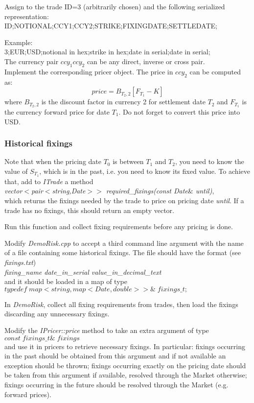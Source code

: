 \documentclass[10pt]{article}
\begin{document}
Assign to the trade ID=3 (arbitrarily chosen) and the following serialized representation:\\
ID;NOTIONAL;CCY1;CCY2;STRIKE;FIXINGDATE;SETTLEDATE;

\noindent Example:\\
3;EUR;USD;notional in hex;strike in hex;date in serial;date in serial;\\

The currency pair $ccy_1ccy_2$ can be any direct, inverse or cross pair.\\

Implement the corresponding pricer object. The price in $ccy_2$ can be computed as:
$$
price=B_{T_2,2}[F_{T_1}-K]
$$
where $B_{T_2,2}$ is the discount factor in currency 2 for settlement date $T_2$ and $F_{T_1}$ is the currency forward price for date $T_1$. Do not forget to convert this price into USD.\\

\subsubsection{Historical fixings}
Note that when the pricing date $T_0$ is between $T_1$ and $T_2$, you need to know the value of $S_{T_1}$, which is in the past, i.e. you need to know its fixed value. To achieve that, add to \textit{ITrade} a method\\
\textit{vector$<$pair$<$string,Date$>>$ required\_fixings(const Date$\&$ until)},\\
which returns the fixings needed by the trade to price on pricing date \textit{until}. If a trade has no fixings, this should return an empty vector.

Run this function and collect fixing requirements before any pricing is done.

Modify \textit{DemoRisk.cpp} to accept a third command line argument with the name of a file containing some historical fixings. The file should have the format (see \textit{fixings.txt})\\
\textit{fixing\_name date\_in\_serial value\_in\_decimal\_text}\\
and it should be loaded in a map of type\\
$typedef\; map<string,map<Date,double>>\&\; fixings\_t;$

In \textit{DemoRisk}, collect all fixing requirements from trades, then load the fixings discarding any unnecessary fixings.

Modify the \textit{IPricer::price} method to take an extra argument of type\\ $const\; fixings\_t\&\; fixings$\\ and use it in pricers to retrieve necessary fixings. In particular: fixings occurring in the past should be obtained from this argument and if not available an exception should be thrown; fixings occurring exactly on the pricing date should be taken from this argument if available, resolved through the Market otherwise; fixings occurring in the future should be resolved through the Market (e.g. forward prices).
\end{document}
